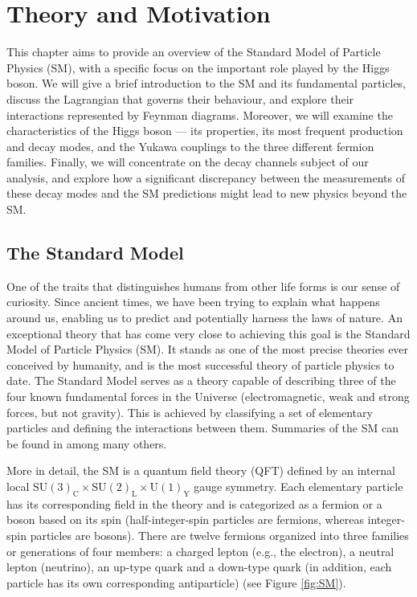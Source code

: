 \chapter[Theory and Motivation]{Theory and Motivation}\label{chap:theory_motivation}

This chapter aims to provide an overview of the Standard Model of Particle Physics (SM), with a specific focus on the important role played by the Higgs boson. We will give a brief introduction to the SM and its fundamental particles, discuss the Lagrangian that governs their behaviour, and explore their interactions represented by Feynman diagrams. Moreover, we will examine the characteristics of the Higgs boson --- its properties, its most frequent production and decay modes, and the Yukawa couplings to the three different fermion families. Finally, we will concentrate on the decay channels subject of our analysis, and explore how a significant discrepancy between the measurements of these decay modes and the SM predictions might lead to new physics beyond the SM.

\section{The Standard Model}\label{sec:SM}

One of the traits that distinguishes humans from other life forms is our sense of curiosity. Since ancient times, we have been trying to explain what happens around us, enabling us to predict and potentially harness the laws of nature. An exceptional theory that has come very close to achieving this goal is the Standard Model of Particle Physics (SM). It stands as one of the most precise theories ever conceived by humanity, and is the most successful theory of particle physics to date. The Standard Model serves as a theory capable of describing three of the four known fundamental forces in the Universe (electromagnetic, weak and strong forces, but not gravity). This is achieved by classifying a set of elementary particles and defining the interactions between them. Summaries of the SM can be found in \cite{Perkins:1982xb, Peskin:1995ev} among many others.

More in detail, the SM is a quantum field theory (QFT) defined by an internal local $\text{SU}(3)_{\text{C}}\times \text{SU}(2)_{\text{L}}\times \text{U}(1)_{\text{Y}}$ gauge symmetry. Each elementary particle has its corresponding field in the theory and is categorized as a fermion or a boson based on its spin (half-integer-spin particles are fermions, whereas integer-spin particles are bosons). There are twelve fermions organized into three families or generations of four members: a charged lepton (e.g., the electron), a neutral lepton (neutrino), an up-type quark and a down-type quark (in addition, each particle has its own corresponding antiparticle) (see Figure \ref{fig:SM}).

